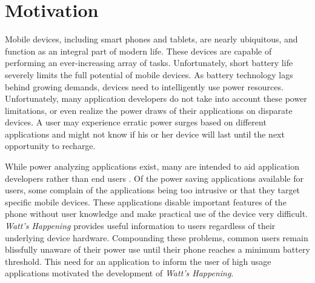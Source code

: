 \section{Motivation}
\label{sec:motivation}
Mobile devices, including smart phones and tablets, are nearly ubiquitous, and function as an integral part of modern life. 
These devices are capable of performing an ever-increasing array of tasks. 
Unfortunately, short battery life severely limits the full potential of mobile devices. 
As battery technology lags behind growing demands, devices need to intelligently use power resources. 
Unfortunately, many application developers do not take into account these power limitations, or even realize the power draws of their applications on disparate devices. 
A user may experience erratic power surges based on different applications and might not know if his or her device will last until the next opportunity to recharge. 

While power analyzing applications exist, many are intended to aid application developers rather than end users \cite{Pathak:2012:ESI:2168836.2168841} \cite{energy-aware}. 
Of the power saving applications available for users, some complain of the applications being too intrusive or that they target specific mobile devices. 
These applications disable important features of the phone without user knowledge and make practical use of the device very difficult.
\emph{Watt's Happening} provides useful information to users regardless of their underlying device hardware.
Compounding these problems, common users remain blissfully unaware of their power use until their phone reaches a minimum battery threshold.
This need for an application to inform the user of high usage applications motivated the development of \emph{Watt's Happening}.
